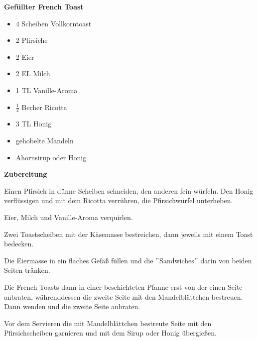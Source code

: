 

\parindent0pt	

\pagestyle{empty}


\textbf{{\LARGE Gefüllter French Toast}}%

\hrulefill
\vspace*{\fill}
\begin{multicols}{2}	


\begin{itemize}
\item 4 Scheiben Vollkorntoast
\item 2 Pfirsiche
\item 2 Eier 
\item 2 EL Milch
\item 1 TL Vanille-Aroma
\item $\frac{1}{2}$ Becher Ricotta
\item 3 TL Honig
\item gehobelte Mandeln
\item Ahornsirup oder Honig
\end{itemize}
\end{multicols}
\vfill			




\vfill
\newpage
\textbf{{\LARGE Zubereitung}}%

\hrulefill

\vspace*{\fill}
\begin{multicols}{2}


Einen Pfirsich in dünne Scheiben schneiden, den anderen fein würfeln.
Den Honig verflüssigen und mit dem Ricotta verrühren, die Pfirsichwürfel
unterheben.\newline

Eier, Milch und Vanille-Aroma verquirlen.\newline

Zwei Toastscheiben mit der Käsemasse bestreichen, dann jeweils mit einem
Toast bedecken.\newline

Die Eiermasse in ein flaches Gefäß füllen und die $"$Sandwiches$"$ darin
von beiden Seiten tränken.

Die French Toasts dann in einer beschichteten Pfanne erst von der einen Seite
anbraten, währenddessen die zweite Seite mit den Mandelblättchen bestreuen.
Dann wenden und die zweite Seite anbraten.\newline

Vor dem Servieren die mit Mandelblättchen bestreute Seite mit den Pfirsichscheiben
garnieren und mit dem Sirup oder Honig übergießen.


\end{multicols}
\vfill
